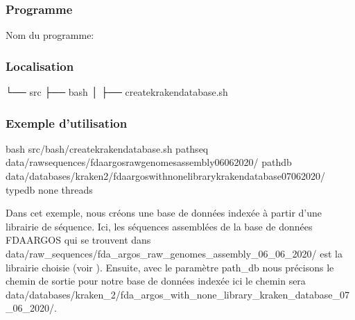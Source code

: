 \documentclass[letterpaper,10pt,french]{sphinxmanual}
\begin{document}
\subsubsection{Programme}
\label{\detokenize{tutorial:id19}}
Nom du programme:

\begin{sphinxVerbatim}[commandchars=\\\{\}]
\end{sphinxVerbatim}


\subsubsection{Localisation}
\label{\detokenize{tutorial:id20}}
\begin{sphinxVerbatim}[commandchars=\\\{\}]
└── src
 ├── bash
 │   ├── create\PYGZus{}kraken\PYGZus{}database.sh
\end{sphinxVerbatim}


\subsubsection{Exemple d’utilisation}
\label{\detokenize{tutorial:id21}}
\begin{sphinxVerbatim}[commandchars=\\\{\}]
bash src/bash/create\PYGZus{}kraken\PYGZus{}database.sh 
             \PYGZhy{}path\PYGZus{}seq data/raw\PYGZus{}sequences/fda\PYGZus{}argos\PYGZus{}raw\PYGZus{}genomes\PYGZus{}assembly\PYGZus{}06\PYGZus{}06\PYGZus{}2020/ 
             \PYGZhy{}path\PYGZus{}db data/databases/kraken\PYGZus{}2/fda\PYGZus{}argos\PYGZus{}with\PYGZus{}none\PYGZus{}library\PYGZus{}kraken\PYGZus{}database\PYGZus{}07\PYGZus{}06\PYGZus{}2020/ 
             \PYGZhy{}type\PYGZus{}db none 
             \PYGZhy{}threads 
\end{sphinxVerbatim}

Dans cet exemple, nous créons une base de données indexée à partir d’une librairie de séquence. Ici, les séquences assemblées de la base de données FDA\sphinxhyphen{}ARGOS qui se trouvent dans data/raw\_sequences/fda\_argos\_raw\_genomes\_assembly\_06\_06\_2020/ est la librairie choisie (voir {\hyperref[\detokenize{tutorial:download-fda-argos}]{}}). Ensuite, avec le paramètre \sphinxhyphen{}path\_db nous précisons le chemin de sortie pour notre base de données indexée ici le chemin sera data/databases/kraken\_2/fda\_argos\_with\_none\_library\_kraken\_database\_07\_06\_2020/.
\end{document}
